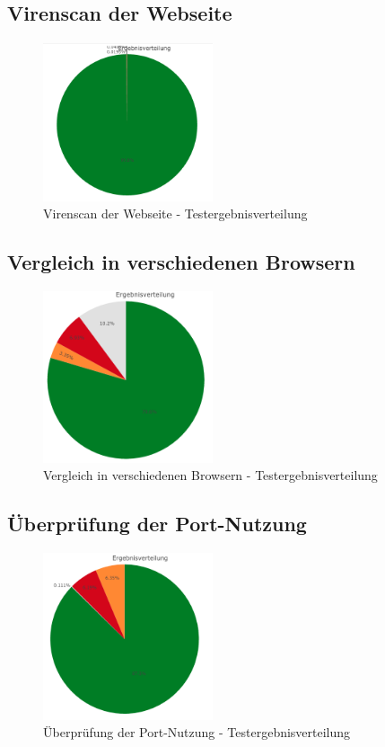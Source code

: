 

\subsection{Virenscan der Webseite}
\begin{figure}[H]
  \centering
  \includegraphics[width=5cm]{images/stats/diavirenscan}
  \caption{Virenscan der Webseite - Testergebnisverteilung}
  \label{fig:diavirenscan}
\end{figure}

\subsection{Vergleich in verschiedenen Browsern}
\begin{figure}[H]
  \centering
  \includegraphics[width=5cm]{images/stats/diaheaderinspection}
  \caption{Vergleich in verschiedenen Browsern - Testergebnisverteilung}
  \label{fig:diaheaderinspection}
\end{figure}

\subsection{Überprüfung der Port-Nutzung}
\begin{figure}[H]
  \centering
  \includegraphics[width=5cm]{images/stats/diaportscan}
  \caption{Überprüfung der Port-Nutzung - Testergebnisverteilung}
  \label{fig:diaportscan}
\end{figure}

